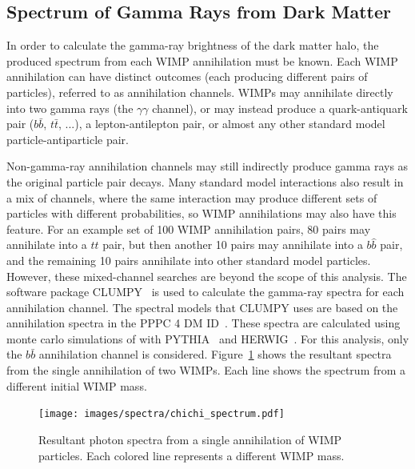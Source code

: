   
  \FloatBarrier
  
    
  \subsection{Spectrum of Gamma Rays from Dark Matter}\label{dm_spectral}
    In order to calculate the gamma-ray brightness of the dark matter halo, the produced spectrum from each WIMP annihilation must be known.
    Each WIMP annihilation can have distinct outcomes (each producing different pairs of particles), referred to as annihilation channels.
    WIMPs may annihilate directly into two gamma rays (the $\gamma\gamma$ channel), or may instead produce a quark-antiquark pair ($b\bar{b}$, $t\bar{t}$, ...), a lepton-antilepton pair, or almost any other standard model particle-antiparticle pair.

    Non-gamma-ray annihilation channels may still indirectly produce gamma rays as the original particle pair decays.
    Many standard model interactions also result in a mix of channels, where the same interaction may produce different sets of particles with different probabilities, so WIMP annihilations may also have this feature.
    For an example set of 100 WIMP annihilation pairs, 80 pairs may annihilate into a $t\hat{t}$ pair, but then another 10 pairs may annihilate into a $b\hat{b}$ pair, and the remaining 10 pairs annihilate into other standard model particles.
    However, these mixed-channel searches are beyond the scope of this analysis.
    The software package CLUMPY~\cite{CLUMPYcode} is used to calculate the gamma-ray spectra for each annihilation channel.
    The spectral models that CLUMPY uses are based on the annihilation spectra in the PPPC 4 DM ID~\cite{pppc4_dm_spectra,pppc4_ewcorrections}.
    These spectra are calculated using monte carlo simulations of with PYTHIA~\cite{pythia} and HERWIG~\cite{herwig}.
    For this analysis, only the $b\bar{b}$ annihilation channel is considered.
    Figure~\ref{fig:chichi_spectrum} shows the resultant spectra from the single annihilation of two WIMPs.
    Each line shows the spectrum from a different initial WIMP mass.

    \begin{figure}[ht]
      \centering
      \texttt{[image: images/spectra/chichi\_spectrum.pdf]}
      \caption[Single Annihilation Spectra]{
        Resultant photon spectra from a single annihilation of WIMP particles.
        Each colored line represents a different WIMP mass.
      }
      \label{fig:chichi_spectrum}
    \end{figure}

